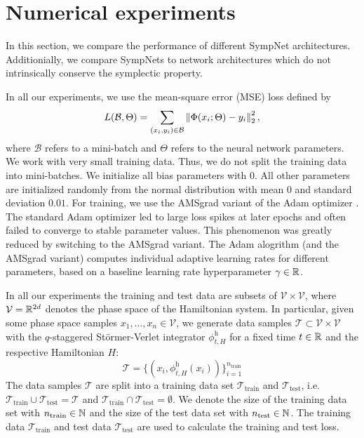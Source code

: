 \documentclass[twoside,a4paper]{article}
\begin{document}
\section{Numerical experiments}

In this section, we compare the performance of different SympNet architectures.
Additionially, we compare SympNets to network architectures which do not intrinsically
conserve the symplectic property.

In all our experiments, we use the mean-square error (MSE) loss defined by
\begin{equation*}
	L(\mathcal{B}, \Theta) = \sum_{(x_i, y_i) \in \mathcal{B}} \left\lVert{\Phi(x_i; \Theta) - y_i}\right\rVert^2_2
	,
\end{equation*}
where $\mathcal{B}$ refers to a mini-batch and $\Theta$ refers to the neural network parameters.
We work with very small training data. Thus, we do not split the training data into mini-batches.
We initialize all bias parameters with $0$. All other parameters are initialized randomly from
the normal distribution with mean $0$ and standard deviation $0.01$.
For training, we use the AMSgrad variant of the Adam optimizer \cite{amsgrad2018}.
The standard Adam optimizer led to large loss spikes at later epochs and often
failed to converge to stable parameter values. This phenomenon
was greatly reduced by switching to the AMSgrad variant. The Adam alogrithm (and the AMSgrad variant)
computes individual adaptive learning rates for different parameters, based on a baseline
learning rate hyperparameter $\gamma \in \mathbb{R}$.

In all our experiments the training and test data are subsets of $\mathcal{V} \times \mathcal{V}$,
where $\mathcal{V} = \mathbb{R}^{2d}$ denotes the phase space of the Hamiltonian system. In particular,
given some phase space samples $x_1, \dots, x_n \in \mathcal{V}$, we generate data samples 
$\mathcal{T} \subset \mathcal{V} \times \mathcal{V}$
with the $q$-staggered Störmer-Verlet integrator $\phi^{\text{h}}_{t,H}$
for a fixed time $t \in \mathbb{R}$ and the respective Hamiltonian $H$:
\begin{equation*}
	\mathcal{T} = \{ (x_i, \phi^{\text{h}}_{t,H}(x_i)) \}_{i=1}^{n_{\text{train}}}
\end{equation*}
The data samples $\mathcal{T}$ are split into a training data set $\mathcal{T}_{\text{train}}$
and $\mathcal{T}_{\text{test}}$, i.e. $\mathcal{T}_{\text{train}} \cup \mathcal{T}_{\text{test}} = \mathcal{T}$
and $\mathcal{T}_{\text{train}} \cap \mathcal{T}_{\text{test}} = \emptyset$. 
We denote the size of the training data set with $n_{\text{train}} \in \mathbb{N}$ and the size of
the test data set with $n_{\text{test}} \in \mathbb{N}$.
The training data
$\mathcal{T}_{\text{train}}$ and test data $\mathcal{T}_{\text{test}}$ are used to 
calculate the training and test loss.
\end{document}
